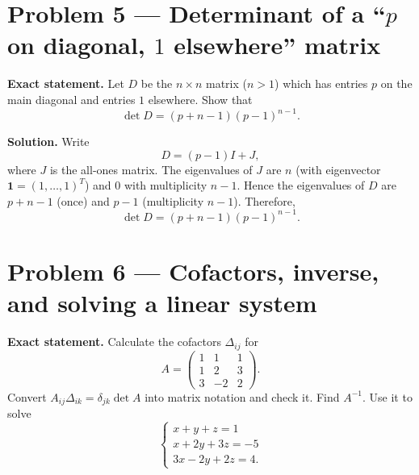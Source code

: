 \documentclass[12pt,a4paper]{article}
\theoremstyle{plain}
\theoremstyle{definition}      %
\begin{document}
\section*{Problem 5 — Determinant of a “\(p\) on diagonal, \(1\) elsewhere” matrix}

\textbf{Exact statement.}
Let \(D\) be the \(n\times n\) matrix (\(n>1\)) which has entries \(p\) on the main diagonal and entries \(1\) elsewhere.
Show that
\[
\det D=(p+n-1)(p-1)^{n-1}.
\]

\textbf{Solution.}
Write
\[
D=(p-1)I+J,
\]
where \(J\) is the all-ones matrix.
The eigenvalues of \(J\) are \(n\) (with eigenvector \(\mathbf{1}=(1,\dots,1)^T\)) and \(0\) with multiplicity \(n-1\).
Hence the eigenvalues of \(D\) are \(p+n-1\) (once) and \(p-1\) (multiplicity \(n-1\)).
Therefore,
\[
\det D=(p+n-1)(p-1)^{n-1}.
\]


\section*{Problem 6 — Cofactors, inverse, and solving a linear system}

\textbf{Exact statement.}
Calculate the cofactors \(\Delta_{ij}\) for
\[
A=\begin{pmatrix}
	1&1&1\\
	1&2&3\\
	3&-2&2
\end{pmatrix}.
\]
Convert \(A_{ij}\Delta_{ik}=\delta_{jk}\det A\) into matrix notation and check it.
Find \(A^{-1}\).
Use it to solve
\[
\begin{cases}
	x+y+z=1\\
	x+2y+3z=-5\\
	3x-2y+2z=4.
\end{cases}
\]
\end{document}
